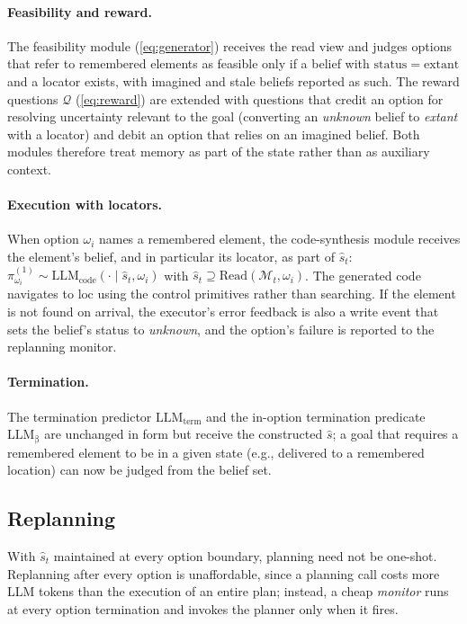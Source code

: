\documentclass[11pt]{article}
\newcommand{\llm}[1]{\mathrm{LLM}_{\mathrm{#1}}}
\newcommand{\calM}{\mathcal{M}}
\newcommand{\calQ}{\mathcal{Q}}
\newcommand{\shat}{\hat{s}}
\newcommand{\Read}{\mathrm{Read}}
\newcommand{\loc}{\mathrm{loc}}
\newcommand{\stat}{\mathrm{status}}
\begin{document}
\paragraph{Feasibility and reward.}
The feasibility module (\ref{eq:generator}) receives the read view and judges options that refer to remembered elements as feasible only if a belief with $\stat=\mathrm{extant}$ and a locator exists, with imagined and stale beliefs reported as such. The reward questions $\calQ$ (\ref{eq:reward}) are extended with questions that credit an option for resolving uncertainty relevant to the goal (converting an \emph{unknown} belief to \emph{extant} with a locator) and debit an option that relies on an imagined belief. Both modules therefore treat memory as part of the state rather than as auxiliary context.

\paragraph{Execution with locators.}
When option $\omega_i$ names a remembered element, the code-synthesis module receives the element's belief, and in particular its locator, as part of $\shat_t$: $\pi^{(1)}_{\omega_i}\sim\llm{code}(\cdot\mid\shat_t,\omega_i)$ with $\shat_t\supseteq\Read(\calM_t,\omega_i)$. The generated code navigates to $\loc$ using the control primitives rather than searching. If the element is not found on arrival, the executor's error feedback is also a write event that sets the belief's status to \emph{unknown}, and the option's failure is reported to the replanning monitor.

\paragraph{Termination.}
The termination predictor $\llm{term}$ and the in-option termination predicate $\llm{\beta}$ are unchanged in form but receive the constructed $\shat$; a goal that requires a remembered element to be in a given state (e.g., delivered to a remembered location) can now be judged from the belief set.

\subsection{Replanning}
\label{sec:replan}

With $\shat_t$ maintained at every option boundary, planning need not be one-shot. Replanning after every option is unaffordable, since a planning call costs more LLM tokens than the execution of an entire plan; instead, a cheap \emph{monitor} runs at every option termination and invokes the planner only when it fires.
\end{document}
